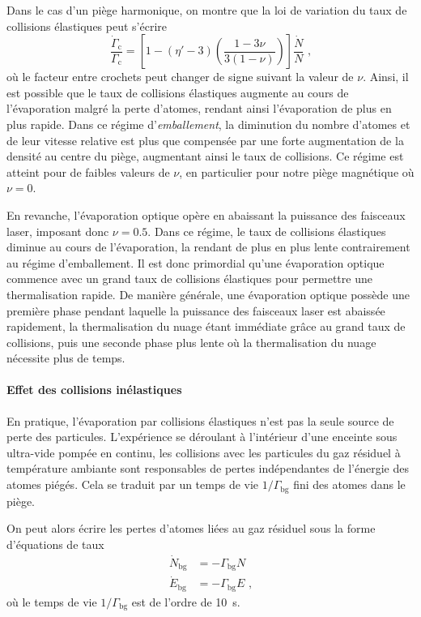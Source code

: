 Dans le cas d'un piège harmonique, on montre que la loi de variation du taux de collisions élastiques peut s'écrire \citep{o2001scaling}
\begin{equation}
\frac{\dot{\Gamma}_{\mathrm{c}}}{\Gamma_{\mathrm{c}}}=\left[ 1- (\eta'-3) \left( \frac{1-3\nu}{3(1-\nu)}\right)\right] \frac{\dot{N}}{N} \text{ ,}
\end{equation}
où le facteur entre crochets peut changer de signe suivant la valeur de $\nu$. Ainsi, il est possible que le taux de collisions élastiques augmente au cours de l'évaporation malgré la perte d'atomes, rendant ainsi l'évaporation de plus en plus rapide. Dans ce régime d'\emph{emballement}, la diminution du nombre d'atomes et de leur vitesse relative est plus que compensée par une forte augmentation de la densité au centre du piège, augmentant ainsi le taux de collisions. Ce régime est atteint pour de faibles valeurs de $\nu$, en particulier pour notre piège magnétique où $\nu=0$. 

En revanche, l'évaporation optique opère en abaissant la puissance des faisceaux laser, imposant donc $\nu=0.5$. Dans ce régime, le taux de collisions élastiques diminue au cours de l'évaporation, la rendant de plus en plus lente contrairement au régime d'emballement. Il est donc primordial qu'une évaporation optique commence avec un grand taux de collisions élastiques pour permettre une thermalisation rapide. De manière générale, une évaporation optique possède une première phase pendant laquelle la puissance des faisceaux laser est abaissée rapidement, la thermalisation du nuage étant immédiate grâce au grand taux de collisions, puis une seconde phase plus lente où la thermalisation du nuage nécessite plus de temps. 





\paragraph*{Effet des collisions inélastiques}
En pratique, l'évaporation par collisions élastiques n'est pas la seule source de perte des particules. L'expérience se déroulant à l'intérieur d'une enceinte sous ultra-vide pompée en continu, les collisions avec les particules du gaz résiduel à température ambiante sont responsables de pertes indépendantes de l'énergie des atomes piégés. Cela se traduit par un temps de vie $1/\Gamma_{\mathrm{bg}}$ fini des atomes dans le piège.

On peut alors écrire les pertes d'atomes liées au gaz résiduel sous la forme d'équations de taux
\begin{align}
\dot{N}_{\mathrm{bg}}&=-\Gamma_{\mathrm{bg}} N  \\
\dot{E}_{\mathrm{bg}}&=-\Gamma_{\mathrm{bg}} E \text{ ,}
\end{align}
où le temps de vie $1/\Gamma_{\mathrm{bg}}$ est de l'ordre de \SI{10}{\second}. 

